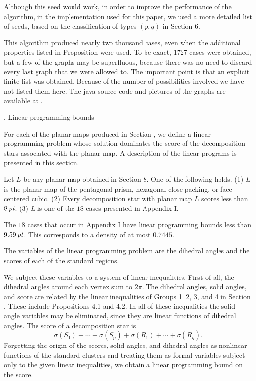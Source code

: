 Although this seed would work, 
in order to improve the performance of the algorithm,
in the implementation used for this paper,
we used a more detailed list of seeds, based on the classification
of types $(p,q)$ in Section 6.

This algorithm produced nearly two thousand cases, 
even when the additional
properties listed in Proposition  were used.   
To be exact, 1727 cases were obtained, but a few of the graphs
may be superfluous, because there was no need to discard every
last graph that we were allowed to.
The important point 
is that an explicit finite list was obtained.  Because of the number
of possibilities involved we have not listed them here.  The
java source code and pictures of the graphs are available at \cite{H2}.  




\head {}. Linear programming bounds\endhead


For each of the planar maps produced in Section ,
we define a linear programming
problem whose solution dominates the score of the decomposition stars
associated with the planar map.  A description of the linear
programs is presented in this section.

  Let $L$ be any planar map obtained in
Section 8.  One of the following holds.  (1)  $L$ is the planar map
of the pentagonal prism, hexagonal close packing, or face-centered
cubic.  (2) Every decomposition star with planar map $L$ scores
less than $8\,\hbox{\it pt}$.  (3)  $L$ is one of the $18$ cases presented
in Appendix I.
\endproclaim

The $18$ cases that occur in Appendix I have linear programming
bounds less than $9.59\,\hbox{\it pt}$.  This corresponds to a density of
at most $0.7445$.
\smallskip

The variables of the linear
programming problem are the dihedral angles and the
scores of each of the standard regions.  

We subject
these variables to a system of linear inequalities.
First of all, the dihedral angles around each vertex sum to $2\pi$.
The dihedral angles, solid angles, and score are related by
the linear inequalities of Groups 1, 2, 3, and 4 in Section .
These include Propositions 4.1 and 4.2.
In all of these inequalities the solid angle variables
 may be eliminated, since
they are linear functions of dihedral angles.
The score of a decomposition star is
$$\sigma(S_1)+\cdots+\sigma(S_p)+\sigma(R_1)+\cdots+\sigma(R_q).$$
Forgetting the origin of the scores, solid angles, and dihedral
angles as nonlinear functions of the standard clusters and treating
them as formal
variables subject only to the given linear inequalities,
 we obtain a linear programming bound on the score.

